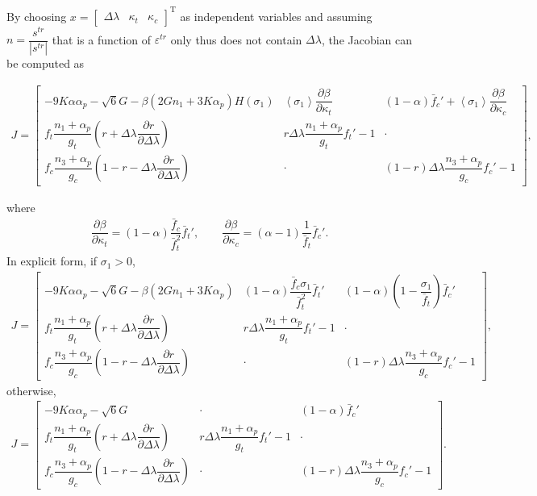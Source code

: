 \documentclass[11pt,fleqn]{article}
\newcommand*{\mT}{\mathrm{T}}
\newcommand*{\pfrac}[2]{\dfrac{\partial#1}{\partial#2}}
\begin{document}
By choosing $x=\begin{bmatrix}
\Delta\lambda&\kappa_t&\kappa_c
\end{bmatrix}^\mT$ as independent variables and assuming $n=\dfrac{s^{tr}}{|s^{tr}|}$ that is a function of $\varepsilon^{tr}$ only thus does not contain $\Delta\lambda$, the Jacobian can be computed as
\begin{small}
\begin{gather*}
J=\begin{bmatrix}
-9K\alpha\alpha_p-\sqrt{6}G-\beta\left(2Gn_1+3K\alpha_p\right)H(\sigma_1)&\left\langle\sigma_1\right\rangle\pfrac{\beta}{\kappa_t}&(1-\alpha)\bar{f}_c'+\left\langle\sigma_1\right\rangle\pfrac{\beta}{\kappa_c}\\[4mm]
f_t\dfrac{n_1+\alpha_p}{g_t}(r+\Delta\lambda\pfrac{r}{\Delta\lambda})&r\Delta\lambda\dfrac{n_1+\alpha_p}{g_t}f_t'-1&\cdot\\[4mm]
f_c\dfrac{n_3+\alpha_p}{g_c}(1-r-\Delta\lambda\pfrac{r}{\Delta\lambda})&\cdot&(1-r)\Delta\lambda\dfrac{n_3+\alpha_p}{g_c}f_c'-1
\end{bmatrix},
\end{gather*}
\end{small}
where
\begin{gather*}
\pfrac{\beta}{\kappa_t}=(1-\alpha)\dfrac{\bar{f}_c}{\bar{f}_t^2}\bar{f}_t',\qquad\pfrac{\beta}{\kappa_c}=(\alpha-1)\dfrac{1}{\bar{f}_t}\bar{f}_c'.
\end{gather*}
In explicit form, if $\sigma_1>0$,
\begin{gather}
J=\begin{bmatrix}
-9K\alpha\alpha_p-\sqrt{6}G-\beta\left(2Gn_1+3K\alpha_p\right)&(1-\alpha)\dfrac{\bar{f}_c\sigma_1}{\bar{f}_t^2}\bar{f}_t'&(1-\alpha)(1-\dfrac{\sigma_1}{\bar{f}_t})\bar{f}_c'\\[4mm]
f_t\dfrac{n_1+\alpha_p}{g_t}(r+\Delta\lambda\pfrac{r}{\Delta\lambda})&r\Delta\lambda\dfrac{n_1+\alpha_p}{g_t}f_t'-1&\cdot\\[4mm]
f_c\dfrac{n_3+\alpha_p}{g_c}(1-r-\Delta\lambda\pfrac{r}{\Delta\lambda})&\cdot&(1-r)\Delta\lambda\dfrac{n_3+\alpha_p}{g_c}f_c'-1
\end{bmatrix},
\end{gather}
otherwise,
\begin{gather}
J=\begin{bmatrix}
-9K\alpha\alpha_p-\sqrt{6}G&\cdot&(1-\alpha)\bar{f}_c'\\[4mm]
f_t\dfrac{n_1+\alpha_p}{g_t}(r+\Delta\lambda\pfrac{r}{\Delta\lambda})&r\Delta\lambda\dfrac{n_1+\alpha_p}{g_t}f_t'-1&\cdot\\[4mm]
f_c\dfrac{n_3+\alpha_p}{g_c}(1-r-\Delta\lambda\pfrac{r}{\Delta\lambda})&\cdot&(1-r)\Delta\lambda\dfrac{n_3+\alpha_p}{g_c}f_c'-1
\end{bmatrix}.
\end{gather}
\end{document}
